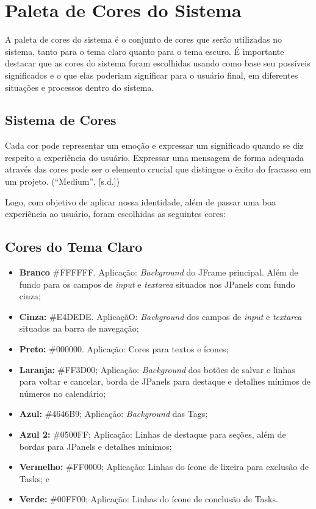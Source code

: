 \documentclass[a4paper,12pt]{article}
\begin{document}
\pagebreak
\section{Paleta de Cores do Sistema}
A paleta de cores do sistema é o conjunto de cores que serão utilizadas no sistema, tanto para o tema claro quanto 
para o tema escuro. É importante destacar que as cores do sistema foram escolhidas usando como base seu possíveis 
significados e o que elas poderiam significar para o usuário final, em diferentes situações e processos dentro do sistema. 

\subsection{Sistema de Cores}
Cada cor pode representar um emoção e expressar um significado quando se diz respeito a experiência do usuário. Expressar uma 
mensagem de forma adequada através das cores pode ser o elemento crucial que distingue o êxito do fracasso em um projeto. (“Medium”, [s.d.])

Logo, com objetivo de aplicar nossa identidade, além de passar uma boa experiência ao usuário, foram escolhidas as seguintes cores:

\subsection{Cores do Tema Claro}
\begin{itemize}
	\item \textbf{Branco} \#FFFFFF. Aplicação: \textit{Background} do JFrame principal. Além de fundo para os campos de \textit{input} e \textit{textarea} 
	situados nos JPanels com fundo cinza;
	\item \textbf{Cinza:} \#E4DEDE. AplicaçãO: \textit{Background} dos campos de \textit{input} e \textit{textarea} situados na barra de navegação;
	\item \textbf{Preto:} \#000000. Aplicação: Cores para textos e ícones;
	\item \textbf{Laranja:} \#FF3D00; Aplicação: \textit{Background} dos botões de salvar e linhas para voltar e cancelar, borda de JPanels 
	para destaque e detalhes mínimos de números no calendário;
	\item \textbf{Azul:} \#4646B9; Aplicação: \textit{Background} das Tags;
	\item \textbf{Azul 2:} \#0500FF; Aplicação: Linhas de destaque para seções, além de bordas para JPanels e detalhes mínimos;
	\item \textbf{Vermelho:} \#FF0000; Aplicação: Linhas do ícone de lixeira para exclusão de Tasks; e
	\item \textbf{Verde:} \#00FF00; Aplicação: Linhas do ícone de conclusão de Tasks.
\end{itemize}
\end{document}
